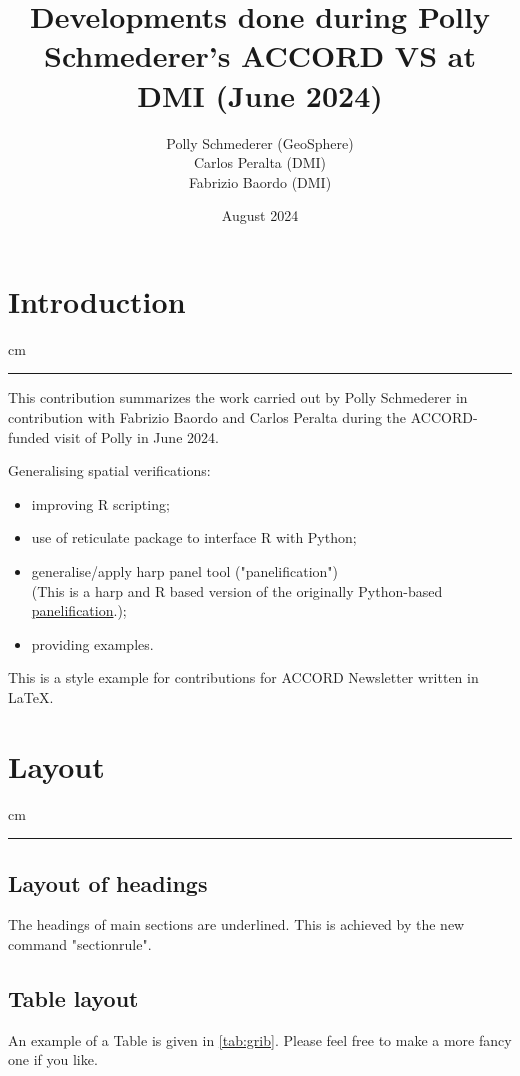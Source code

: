 \documentclass[11pt,a4paper]{article}
\date{}
\title{Developments done during Polly Schmederer's ACCORD VS at DMI (June 2024) }
\author{Polly Schmederer (GeoSphere) \\ Carlos Peralta (DMI) \\ Fabrizio Baordo (DMI)}
\date{August 2024}
\newcommand {\sectionrule}{\vskip -0.9 cm
\color {mygray} \rule [0 cm] {17 cm}{0.1 mm} \color {black}}
\begin{document}
\maketitle
\thispagestyle{fancy}

\section{Introduction}
\sectionrule
This contribution summarizes the work carried out by Polly Schmederer in contribution with Fabrizio Baordo
and Carlos Peralta during the ACCORD-funded visit of Polly in June 2024.

Generalising spatial verifications: 
\begin{itemize}
    \item improving R scripting;
    \item use of reticulate package to interface R with Python;
    \item generalise/apply harp panel tool ("panelification")\\
    (This is a harp and R based version of the originally Python-based \href{https://github.com/pscheffknecht-geosphere/panelification/tree/main}{panelification}.);
    \item providing examples.
\end{itemize}


This is a style example for contributions for ACCORD Newsletter written in \LaTeX. 


\section{Layout}
\sectionrule

\subsection{Layout of headings}

The headings of main sections are underlined. This is achieved by the new command "sectionrule".

\subsection{Table layout}

An example of a Table is given in \ref{tab:grib}. Please feel free to make a more fancy one if you like.
\end{document}
